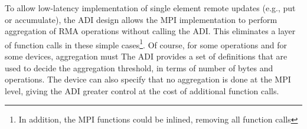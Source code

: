 \documentclass{article}
\begin{document}
To allow low-latency implementation of single element remote updates
(e.g., put or accumulate), the ADI design allows the MPI
implementation to perform aggregation of RMA operations without
calling the ADI.  This eliminates a layer of function calls in these
simple cases\footnote{In addition, the MPI functions could be inlined,
removing all function calls}.  Of course, for some operations and for
some devices, aggregation must 
The ADI provides a set of definitions
that are used to decide the aggregation threshold, in terms of number
of bytes and operations.  The device can also specify that no
aggregation is done at the MPI level, giving the ADI greater control
at the cost of additional function calls.
%
%
\end{document}
